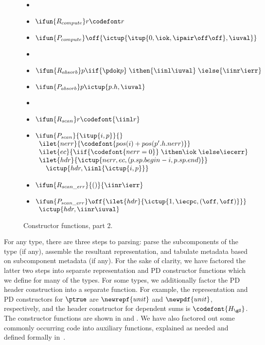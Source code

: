 \begin{figure}
\begin{itemize}
\item[] %
\item[] $\ifun{R_{compute}} r {\codefont r}$
\item[] $\ifun{P_{compute}} \off {\ictup{\itup{0,\iok,\ipair \off \off},\iuval}}$

\item[] %
\item[] $\ifun {R_{absorb}} p {\iif {\pdok p}\; 
    \ithen {\iinl \iuval}\; \ielse {\iinr \ierr}}$
\item[] $\ifun {P_{absorb}} p {\ictup{p.h,\iuval}}$

\item[] %
\item[] $\ifun{R_{scan}} r  {\codefont{\iinl r}}$
\item[] $\ifun{P_{scan}} {\itup{i,p}} {}$ \\
$\begin{array}{l}
\ilet {nerr} {\codefont{pos(i) + pos(p'.h.nerr)}}\\
\ilet {ec} {\iif {\codefont{nerr = 0}}\; \ithen \iok\; \ielse \iecerr} \\
\ilet {hdr} {\ictup{nerr,ec,(p.sp.begin - i,p.sp.end)}} \\
\quad \ictup{hdr,\iinl {\ictup{i,p}}}
\end{array}$

\item[] $\ifun {R_{scan\_err}} {()} {\iinr \ierr}$
\item[] $\ifun {P_{scan\_err}} \off {\ilet {hdr} {\ictup{1,\iecpc,(\off,\off)}}}$\\
  \verb+ +$\ictup{hdr,\iinr \iuval}$
\end{itemize}
\caption{Constructor functions, part 2.}
\label{fig:cons-funs-cont}
\end{figure}

For any type, there are three steps to parsing: parse the
subcomponents of the type (if any), assemble the resultant
representation, and tabulate metadata based on subcomponent metadata
(if any). For the sake of clarity, we have factored the latter two
steps into separate representation and PD constructor functions which
we define for many of the types. For some types, we additionally factor the PD
header construction into a separate function. For example, the
representation and PD constructors for $\ptrue$ are $\newrepf {unit}$
and $\newpdf {unit}$, respectively, and the header constructor for
dependent sums is ${\codefont{H_{\gS}}}$. The constructor functions are shown in
 and . We have also
factored out some commonly occurring code into auxiliary functions,
explained as needed and defined formally in~.

